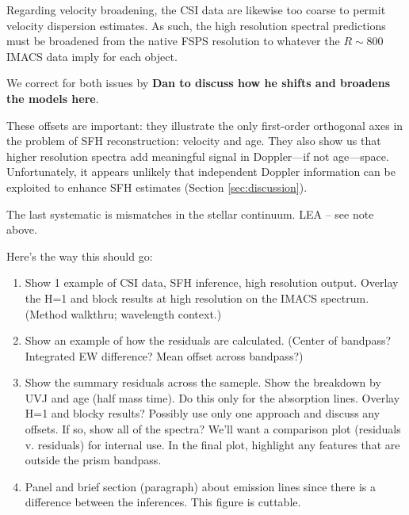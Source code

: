 \documentclass[a4paper,fleqn,usenatbib]{mnras}
\newcommand{\bfr}{\bf\color{red}}
\newcommand{\bfb}{\color{myblue}}
\newcommand{\benum}{\begin{enumerate}}
\newcommand{\eenum}{\end{enumerate}}
\begin{document}
Regarding velocity broadening, the CSI data are likewise too coarse to permit velocity
dispersion estimates. As such, the high resolution spectral predictions
must be broadened from the native FSPS resolution to whatever the $R\sim800$ IMACS data imply
for each object. 

We correct for both issues by {\bfr Dan to discuss how he shifts and broadens the models here}.

These offsets are important: they illustrate the only first-order orthogonal axes in the problem of SFH 
reconstruction: velocity and age. They also show us that higher resolution spectra add meaningful 
signal in Doppler---if not age---space. Unfortunately, it appears unlikely that independent Doppler
information can be exploited to enhance SFH estimates (Section \ref{sec:discussion}). 

The last systematic is mismatches in the stellar continuum. {\bfb LEA -- see note above.}

Here's the way this should go:
\benum
	\item Show 1 example of CSI data, SFH inference, high resolution output. Overlay the H=1 and block
		results at high resolution on the IMACS spectrum. (Method walkthru; wavelength context.)
	\item Show an example of how the residuals are calculated. (Center of bandpass? Integrated EW
		difference? Mean offset across bandpass?)
	\item Show the summary residuals across the sameple. Show the breakdown by UVJ and age 
		(half mass time). 	Do this only for the absorption lines. Overlay H=1 and blocky results? Possibly use
		only one approach and discuss any offsets. If so, show all of the spectra? We'll want a comparison 
		plot (residuals v. residuals) for internal use. In the final plot, highlight any features that are 
		outside the 	prism bandpass.
	\item Panel and brief section (paragraph) about emission lines since there is a difference between
		the inferences. This figure is cuttable.
\eenum
\fi
\end{document}
